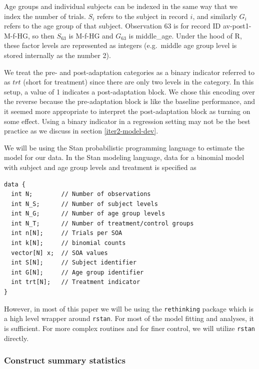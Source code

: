 \documentclass[11pt, oneside, openany]{scrbook}
\begin{document}
Age groups and individual subjects can be indexed in the same way that we index the number of trials. \(S_i\) refers to the subject in record \(i\), and similarly \(G_i\) refers to the age group of that subject. Observation 63 is for record ID av-post1-M-f-HG, so then \(S_{63}\) is M-f-HG and \(G_{63}\) is middle\_age. Under the hood of R, these factor levels are represented as integers (e.g.~middle age group level is stored internally as the number 2).

We treat the pre- and post-adaptation categories as a binary indicator referred to as \(trt\) (short for treatment) since there are only two levels in the category. In this setup, a value of 1 indicates a post-adaptation block. We chose this encoding over the reverse because the pre-adaptation block is like the baseline performance, and it seemed more appropriate to interpret the post-adaptation block as turning on some effect. Using a binary indicator in a regression setting may not be the best practice as we discuss in section \ref{iter2-model-dev}.

We will be using the Stan probabilistic programming language to estimate the model for our data. In the Stan modeling language, data for a binomial model with subject and age group levels and treatment is specified as


\begin{verbatim}
data {
  int N;        // Number of observations
  int N_S;      // Number of subject levels
  int N_G;      // Number of age group levels
  int N_T;      // Number of treatment/control groups
  int n[N];     // Trials per SOA
  int k[N];     // binomial counts
  vector[N] x;  // SOA values
  int S[N];     // Subject identifier
  int G[N];     // Age group identifier
  int trt[N];   // Treatment indicator
}
\end{verbatim}


However, in most of this paper we will be using the \texttt{rethinking} package \citep{R-rethinking} which is a high level wrapper around \texttt{rstan}. For most of the model fitting and analyses, it is sufficient. For more complex routines and for finer control, we will utilize \texttt{rstan} directly.

\hypertarget{iter1-sum-stats}{%
\subsubsection{Construct summary statistics}\label{iter1-sum-stats}}
\end{document}
